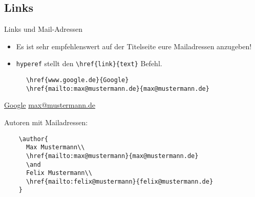 \subsection{Links}
\begin{frame}[fragile]{Links und Mail-Adressen}
  \begin{itemize}
    \item Es ist sehr empfehlenswert auf der Titelseite eure Mailadressen anzugeben!
    \item \texttt{hyperef} stellt den \lstinline+\href{link}{text}+ Befehl.
  \end{itemize}
  \begin{CodeExample}{0.7}
    \begin{lstlisting}
      \href{www.google.de}{Google}
      \href{mailto:max@mustermann.de}{max@mustermann.de}
    \end{lstlisting}
    \CodeResult
    \href{www.google.de}{Google}
    \href{mailto:max@mustermann.de}{max@mustermann.de}
  \end{CodeExample}
  \begin{block}{Autoren mit Mailadressen:}
    \begin{lstlisting}
    \author{
      Max Mustermann\\
      \href{mailto:max@mustermann}{max@mustermann.de}
      \and
      Felix Mustermann\\
      \href{mailto:felix@mustermann}{felix@mustermann.de}
    }
    \end{lstlisting}
  \end{block}
\end{frame}
